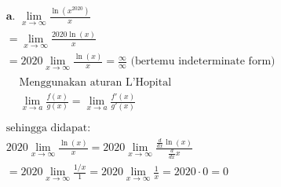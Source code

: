 \documentclass[12pt]{article}
\begin{document}
\par\noindent
\begin{fleqn}[2em]

\begin{align*}
\boxed{
\begin{aligned}
  & \textbf{a. } \lim_{x \to \infty} \frac{\ln\left(x^{2020}\right)}{x} \\
  & = \lim_{x \to \infty} \frac{2020 \ln\left(x\right)}{x} \\
  & = 2020 \lim_{x \to \infty} \frac{\ln\left(x\right)}{x}
    = \frac{\infty}{\infty} \text{ (bertemu indeterminate form)} \\
  & \boxed{
    \begin{aligned}
      & \text{Menggunakan aturan L'Hopital} \\
      & \lim_{x \to a} \frac{f(x)}{g(x)} = \lim_{x \to a} \frac{f'(x)}{g'(x)} \\
    \end{aligned}
  } \\
  & \text{sehingga didapat: } \\
  & 2020 \lim_{x \to \infty} \frac{\ln\left(x\right)}{x}
    = 2020 \lim_{x \to \infty} \frac{\frac{d}{dx} \ln\left(x\right)}{\frac{d}{dx} x} \\ ~
  & = 2020 \lim_{x \to \infty} \frac{1/x}{1}
    = 2020 \lim_{x \to \infty} \frac{1}{x} = 2020 \cdot 0 = 0
\end{aligned}
}
\end{align*}


\end{fleqn}
\end{document}
